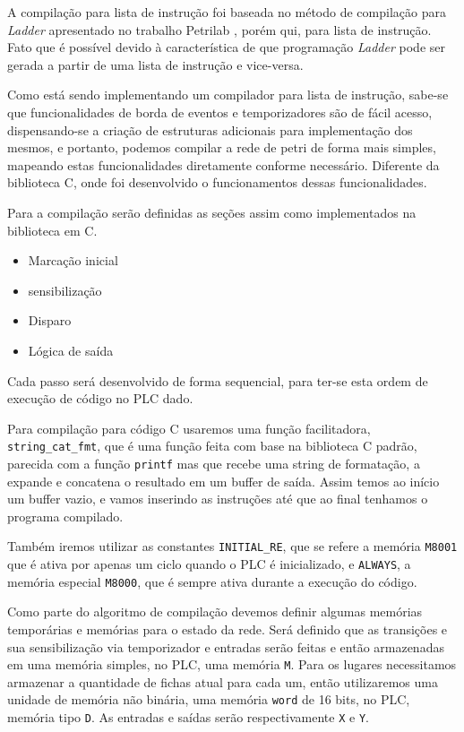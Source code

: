 A compilação para lista de instrução foi baseada no método de compilação para \textit{Ladder} apresentado no trabalho Petrilab \cite{de2015petrilab}, porém qui, para lista de instrução. Fato que é possível devido à característica de que programação \textit{Ladder} pode ser gerada a partir de uma lista de instrução e vice-versa.   

Como está sendo implementando um compilador para lista de instrução, sabe-se que funcionalidades de borda de eventos e temporizadores são de fácil acesso, dispensando-se a criação de estruturas adicionais para implementação dos mesmos, e portanto, podemos compilar a rede de petri de forma mais simples, mapeando estas funcionalidades diretamente conforme necessário. Diferente da biblioteca C, onde foi desenvolvido o funcionamentos dessas funcionalidades.

Para a compilação serão definidas as seções assim como implementados na biblioteca em C.

\begin{itemize}
	\item Marcação inicial
	\item sensibilização
	\item Disparo
	\item Lógica de saída
\end{itemize}

Cada passo será desenvolvido de forma sequencial, para ter-se esta ordem de execução de código no PLC dado.

Para compilação para código C usaremos uma função facilitadora, \lstinline{string_cat_fmt}, que é uma função feita com base na biblioteca C padrão, parecida com a função \lstinline{printf} mas que recebe uma string de formatação, a expande e concatena o resultado em um buffer de saída. Assim temos ao início um buffer vazio, e vamos inserindo as instruções até que ao final tenhamos o programa compilado. 

Também iremos utilizar as constantes \lstinline{INITIAL_RE}, que se refere a memória \lstinline{M8001} que é ativa por apenas um ciclo quando o PLC é inicializado, e \lstinline{ALWAYS}, a memória especial \lstinline{M8000}, que é sempre ativa durante a execução do código.

Como parte do algoritmo de compilação devemos definir algumas memórias temporárias e memórias para o estado da rede. Será definido que as transições e sua sensibilização via temporizador e entradas serão feitas e então armazenadas em uma memória simples, no PLC, uma memória \lstinline{M}. Para os lugares necessitamos armazenar a quantidade de fichas atual para cada um, então utilizaremos uma unidade de memória não binária, uma memória \lstinline{word} de 16 bits, no PLC, memória tipo \lstinline{D}. As entradas e saídas serão respectivamente \lstinline{X} e \lstinline{Y}.

